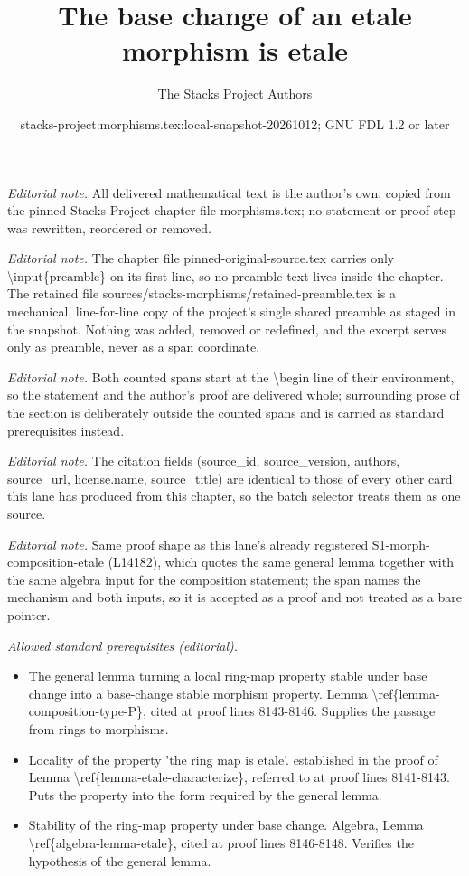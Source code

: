 \documentclass[10pt,a4paper]{amsart}
\title{The base change of an etale morphism is etale}
\author{The Stacks Project Authors}
\date{stacks-project:morphisms.tex:local-snapshot-20261012; GNU FDL 1.2 or later}
\theoremstyle{plain}
\theoremstyle{definition}
\theoremstyle{remark}
\numberwithin{equation}{subsection}
\begin{document}
\maketitle
\setcounter{subsection}{1}
\noindent\textit{Editorial note.} All delivered mathematical text is the author's own, copied from the pinned Stacks Project chapter file morphisms.tex; no statement or proof step was rewritten, reordered or removed.\par\medskip
\noindent\textit{Editorial note.} The chapter file pinned-original-source.tex carries only \textbackslash{}input\{preamble\} on its first line, so no preamble text lives inside the chapter. The retained file sources/stacks-morphisms/retained-preamble.tex is a mechanical, line-for-line copy of the project's single shared preamble as staged in the snapshot. Nothing was added, removed or redefined, and the excerpt serves only as preamble, never as a span coordinate.\par\medskip
\noindent\textit{Editorial note.} Both counted spans start at the \textbackslash{}begin line of their environment, so the statement and the author's proof are delivered whole; surrounding prose of the section is deliberately outside the counted spans and is carried as standard prerequisites instead.\par\medskip
\noindent\textit{Editorial note.} The citation fields (source\_id, source\_version, authors, source\_url, license.name, source\_title) are identical to those of every other card this lane has produced from this chapter, so the batch selector treats them as one source.\par\medskip
\noindent\textit{Editorial note.} Same proof shape as this lane's already registered S1-morph-composition-etale (L14182), which quotes the same general lemma together with the same algebra input for the composition statement; the span names the mechanism and both inputs, so it is accepted as a proof and not treated as a bare pointer.\par\medskip
\noindent\textit{Allowed standard prerequisites (editorial).}\begin{itemize}
\item The general lemma turning a local ring-map property stable under base change into a base-change stable morphism property. Lemma \textbackslash{}ref\{lemma-composition-type-P\}, cited at proof lines 8143-8146. Supplies the passage from rings to morphisms.
\item Locality of the property 'the ring map is etale'. established in the proof of Lemma \textbackslash{}ref\{lemma-etale-characterize\}, referred to at proof lines 8141-8143. Puts the property into the form required by the general lemma.
\item Stability of the ring-map property under base change. Algebra, Lemma \textbackslash{}ref\{algebra-lemma-etale\}, cited at proof lines 8146-8148. Verifies the hypothesis of the general lemma.
\end{itemize}\medskip
\end{document}
